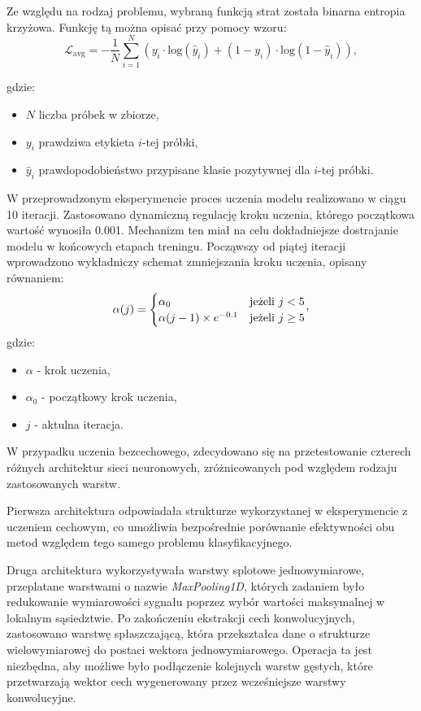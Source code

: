 \documentclass[a4paper,twoside,12pt]{book}
\begin{document}
Ze względu na rodzaj problemu, wybraną funkcją strat została binarna entropia krzyżowa. Funkcję tą można opisać przy pomocy wzoru:
\begin{equation}
	\mathcal{L}_{\text{avg}} = - \frac{1}{N} \sum_{i=1}^{N} \left( y_i \cdot \mathrm{log}(\hat{y}_i) + (1 - y_i) \cdot \mathrm{log}(1 - \hat{y}_i) \right),
\end{equation}

\noindent gdzie:
\begin{itemize}
	\item $N$  liczba próbek w zbiorze,
	\item $y_i$  prawdziwa etykieta $i$-tej próbki,
	\item $\hat{y}_i$  prawdopodobieństwo przypisane klasie pozytywnej dla $i$-tej próbki.
\end{itemize}
W przeprowadzonym eksperymencie proces uczenia modelu realizowano w ciągu 10 iteracji. Zastosowano dynamiczną regulację kroku uczenia, którego początkowa wartość wynosiła 0.001. Mechanizm ten miał na celu dokładniejsze dostrajanie modelu w końcowych etapach treningu. Począwszy od piątej iteracji wprowadzono wykładniczy schemat zmniejszania kroku uczenia, opisany równaniem:
\begin{equation}
	\alpha(j) =
	\begin{cases}
		\alpha_0                      & \text{jeżeli } j < 5    \\
		\alpha(j - 1) \times e^{-0.1} & \text{jeżeli } j \geq 5
	\end{cases}
	\!\vcenter{\hbox{,}}
\end{equation}
\noindent gdzie:
\begin{itemize}
	\item $ \alpha$ - krok uczenia,
	\item $ \alpha_0$ - początkowy krok uczenia,
	\item $j$ - aktulna iteracja.
\end{itemize}

W przypadku uczenia bezcechowego, zdecydowano się na przetestowanie czterech różnych architektur sieci neuronowych, zróżnicowanych pod względem rodzaju zastosowanych warstw.

Pierwsza architektura odpowiadała strukturze wykorzystanej w eksperymencie z uczeniem cechowym, co umożliwia bezpośrednie porównanie efektywności obu metod względem tego samego problemu klasyfikacyjnego.

Druga architektura wykorzystywała warstwy splotowe jednowymiarowe, przeplatane warstwami o nazwie \textit{MaxPooling1D}, których zadaniem było redukowanie wymiarowości sygnału poprzez wybór wartości maksymalnej w lokalnym sąsiedztwie. Po zakończeniu ekstrakcji cech konwolucyjnych, zastosowano warstwę spłaszczającą, która przekształca dane o strukturze wielowymiarowej do postaci wektora jednowymiarowego. Operacja ta jest niezbędna, aby możliwe było podłączenie kolejnych warstw gęstych, które przetwarzają wektor cech wygenerowany przez wcześniejsze warstwy konwolucyjne.
\end{document}
